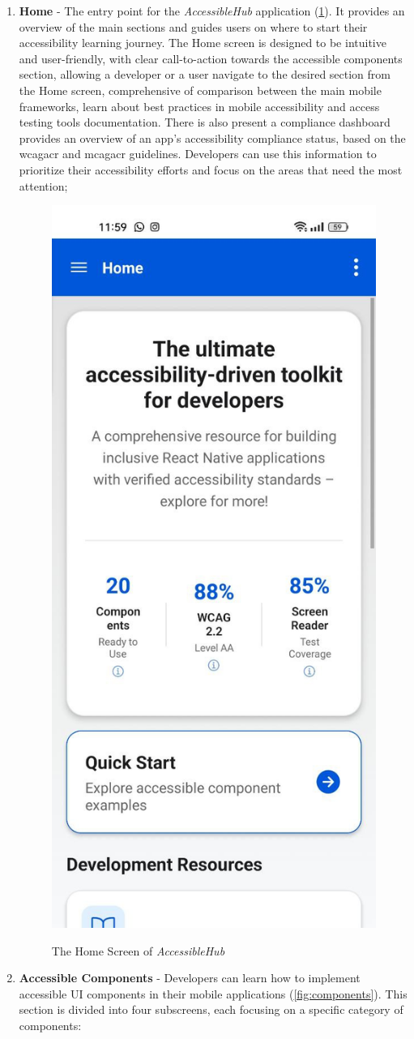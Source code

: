 \begin{enumerate}
    \item \textbf{Home} - The entry point for the \textit{AccessibleHub} application (\ref{fig:homescreen}). It provides an overview of the main sections and guides users on where to start their accessibility learning journey. The Home screen is designed to be intuitive and user-friendly, with clear call-to-action towards the accessible components section, allowing a developer or a user navigate to the desired section from the Home screen, comprehensive of comparison between the main mobile frameworks, learn about best practices in mobile accessibility and access testing tools documentation. There is also present a compliance dashboard provides an overview of an app's accessibility compliance status, based on the \acrshort{wcagacr} and \acrshort{mcagacr} guidelines. Developers can use this information to prioritize their accessibility efforts and focus on the areas that need the most attention;

    \begin{figure}[ht]
    \centering
    \includegraphics[width=0.4\linewidth, alt={Screenshot of the Home Screen of AccessibleHub}]{img/homescreen.jpg}
    \caption{The Home Screen of \textit{AccessibleHub}}\label{fig:homescreen}
    \end{figure}

\pagebreak

    \item \textbf{Accessible Components} - Developers can learn how to implement accessible UI components in their mobile applications (\ref{fig:components}). This section is divided into four subscreens, each focusing on a specific category of components:


\end{enumerate}
